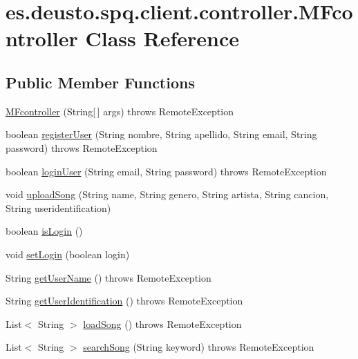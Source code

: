 \hypertarget{classes_1_1deusto_1_1spq_1_1client_1_1controller_1_1_m_fcontroller}{}\section{es.\+deusto.\+spq.\+client.\+controller.\+M\+Fcontroller Class Reference}
\label{classes_1_1deusto_1_1spq_1_1client_1_1controller_1_1_m_fcontroller}
\subsection*{Public Member Functions}
\begin{DoxyCompactItemize}
\item 
\hyperlink{classes_1_1deusto_1_1spq_1_1client_1_1controller_1_1_m_fcontroller_ae3acf517cd787cc5db7f40194b50b3a6}{M\+Fcontroller} (String\mbox{[}$\,$\mbox{]} args)  throws Remote\+Exception 
\item 
boolean \hyperlink{classes_1_1deusto_1_1spq_1_1client_1_1controller_1_1_m_fcontroller_a1f86406201f8a172b8aeabc196fd18dc}{register\+User} (String nombre, String apellido, String email, String password)  throws Remote\+Exception 
\item 
boolean \hyperlink{classes_1_1deusto_1_1spq_1_1client_1_1controller_1_1_m_fcontroller_a6f7961fbefdbf44adc004b2e5a7f1568}{login\+User} (String email, String password)  throws Remote\+Exception 
\item 
void \hyperlink{classes_1_1deusto_1_1spq_1_1client_1_1controller_1_1_m_fcontroller_a1085b9339fc5c96ceb989e31d27148f4}{upload\+Song} (String name, String genero, String artista, String cancion, String useridentification)
\item 
boolean \hyperlink{classes_1_1deusto_1_1spq_1_1client_1_1controller_1_1_m_fcontroller_a09cef1dc25fedc61b2b659f3573b6845}{is\+Login} ()
\item 
void \hyperlink{classes_1_1deusto_1_1spq_1_1client_1_1controller_1_1_m_fcontroller_a841cd5e76842d8c50489a3675381e6fb}{set\+Login} (boolean login)
\item 
String \hyperlink{classes_1_1deusto_1_1spq_1_1client_1_1controller_1_1_m_fcontroller_adeab8e80b090fbac2faaf734872d9e0f}{get\+User\+Name} ()  throws Remote\+Exception 
\item 
String \hyperlink{classes_1_1deusto_1_1spq_1_1client_1_1controller_1_1_m_fcontroller_a964e53f75bbb378eb4c10c1e050e92ac}{get\+User\+Identification} ()  throws Remote\+Exception 
\item 
List$<$ String $>$ \hyperlink{classes_1_1deusto_1_1spq_1_1client_1_1controller_1_1_m_fcontroller_a417ee2c4a93e720473db38aaee5a24ba}{load\+Song} ()  throws Remote\+Exception 
\item 
List$<$ String $>$ \hyperlink{classes_1_1deusto_1_1spq_1_1client_1_1controller_1_1_m_fcontroller_a741cf0c10385caaebd3297b3c135b12d}{search\+Song} (String keyword)  throws Remote\+Exception 
\end{DoxyCompactItemize}
